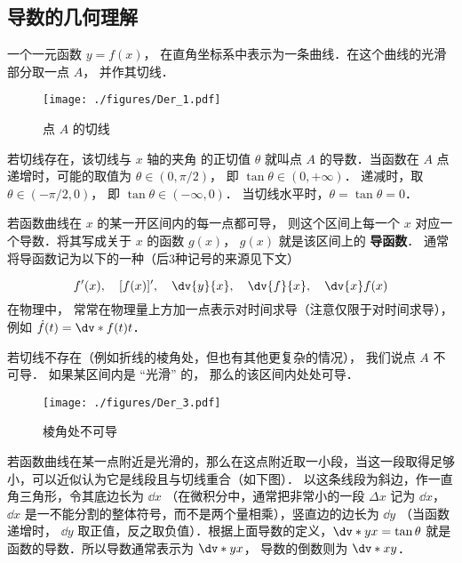 

\subsection{导数的几何理解}

一个一元函数 $y = f(x)$， 在直角坐标系中表示为一条曲线．在这个曲线的光滑部分取一点 $A$， 并作其切线．

\begin{figure}[ht]
\centering
\texttt{[image: ./figures/Der\_1.pdf]}
\caption{点 $A$ 的切线}
\end{figure}


若切线存在，该切线与 $x$ 轴的夹角 的正切值 $\theta$ 就叫点 $A$ 的导数．当函数在 $A$ 点递增时，可能的取值为 $\theta \in (0,\pi/2)$， 即 $\tan \theta  \in (0, + \infty)$． 递减时，取 $\theta  \in (-\pi/2,0)$， 即 $\tan \theta \in (-\infty ,0)$． 当切线水平时，$\theta  = \tan \theta  = 0$． 

若函数曲线在 $x$ 的某一开区间内的每一点都可导， 则这个区间上每一个 $x$ 对应一个导数．将其写成关于 $x$ 的函数 $g(x)$，  $g(x)$  就是该区间上的 \textbf{导函数}． 通常将导函数记为以下的一种（后3种记号的来源见下文）

\begin{equation}\label{Der_eq1}
f'(x),\quad [f(x)]',\quad \dv{y}{x},\quad \dv{f}{x},\quad \dv{x}f(x)
\end{equation}
在物理中， 常常在物理量上方加一点表示对时间求导（注意仅限于对时间求导）， 例如 $\dot f(t) = \dv*{f(t)}{t}$．

若切线不存在（例如折线的棱角处，但也有其他更复杂的情况）， 我们说点 $A$ 不可导． 如果某区间内是 “光滑” 的， 那么的该区间内处处可导．

\begin{figure}[ht]
\centering
\texttt{[image: ./figures/Der\_3.pdf]}
\caption{棱角处不可导}
\end{figure}

若函数曲线在某一点附近是光滑的，那么在这点附近取一小段，当这一段取得足够小，可以近似认为它是线段且与切线重合（如下图）． 以这条线段为斜边，作一直角三角形，令其底边长为 $\dd{x}$ （在微积分中，通常把非常小的一段 $\Delta x$ 记为 $\dd{x}$，  $\dd{x}$ 是一不能分割的整体符号，而不是两个量相乘），竖直边的边长为 $\dd{y}$ （当函数递增时， $\dd{y}$ 取正值，反之取负值）．根据上面导数的定义，$\dv*{y}{x} = \tan \theta $ 就是函数的导数．所以导数通常表示为 $\dv*{y}{x}$， 导数的倒数则为 $\dv*{x}{y}$． 

